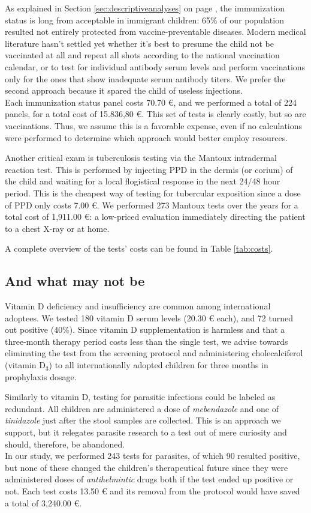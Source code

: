 As explained in Section \ref{sec:descriptiveanalyses} on page \pageref{sec:descriptiveanalyses}, the immunization status is long from acceptable in immigrant children: 65\% of our population resulted not entirely protected from vaccine-preventable diseases. Modern medical literature hasn't settled yet whether it's best to presume the child not be vaccinated at all and repeat all shots according to the national vaccination calendar, or to test for individual antibody serum levels and perform vaccinations only for the ones that show inadequate serum antibody titers. We prefer the second approach because it spared the child of useless injections.\\
Each immunization status panel costs 70.70 €, and we performed a total of 224 panels, for a total cost of 15.836,80 €. This set of tests  is clearly costly, but so are vaccinations. Thus, we assume this is a favorable expense, even if no calculations were performed to determine which approach would better employ resources.

Another critical exam is tuberculosis testing via the Mantoux intradermal reaction test. This is performed by injecting PPD in the dermis (or corium) of the child and waiting for a local flogistical response in the next 24/48 hour period. This is the cheapest way of testing for tubercular exposition since a dose of PPD only costs 7.00 €. We performed 273 Mantoux tests over the years for a total cost of 1,911.00 €: a low-priced evaluation immediately directing the patient to a chest X-ray or at home.

A complete overview of the tests' costs can be found in Table \ref{tab:costs}.

\subsection{And what may not be}\label{sub:notworthwhile}
Vitamin D deficiency and insufficiency are common among international adoptees. We tested 180 vitamin D serum levels (20.30 € each), and 72 turned out positive (40\%). Since vitamin D supplementation is harmless and that a three-month therapy period costs less than the single test, we advise towards eliminating the test from the screening protocol and administering cholecalciferol (vitamin D$_3$) to all internationally adopted children for three months in prophylaxis dosage.

Similarly to vitamin D, testing for parasitic infections could be labeled as redundant. All children are administered a dose of \textit{mebendazole} and one of \textit{tinidazole} just after the stool samples are collected. This is an approach we support, but it relegates parasite research to a test out of mere curiosity and should, therefore, be abandoned.\\
In our study, we performed 243 tests for parasites, of which 90 resulted positive, but none of these changed the children's therapeutical future since they were administered doses of \textit{antihelmintic} drugs both if the test ended up positive or not. Each test costs 13.50 € and its removal from the protocol would have saved a total of 3,240.00 €.

